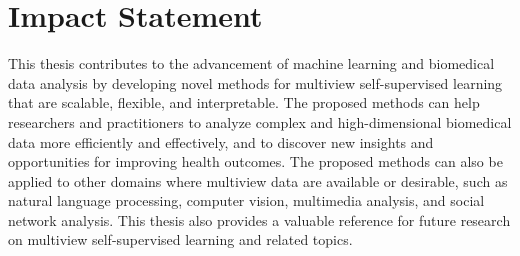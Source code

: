 \chapter*{Impact Statement}

This thesis contributes to the advancement of machine learning and biomedical data analysis by developing novel methods for multiview self-supervised learning that are scalable, flexible, and interpretable. The proposed methods can help researchers and practitioners to analyze complex and high-dimensional biomedical data more efficiently and effectively, and to discover new insights and opportunities for improving health outcomes. The proposed methods can also be applied to other domains where multiview data are available or desirable, such as natural language processing, computer vision, multimedia analysis, and social network analysis. This thesis also provides a valuable reference for future research on multiview self-supervised learning and related topics.
